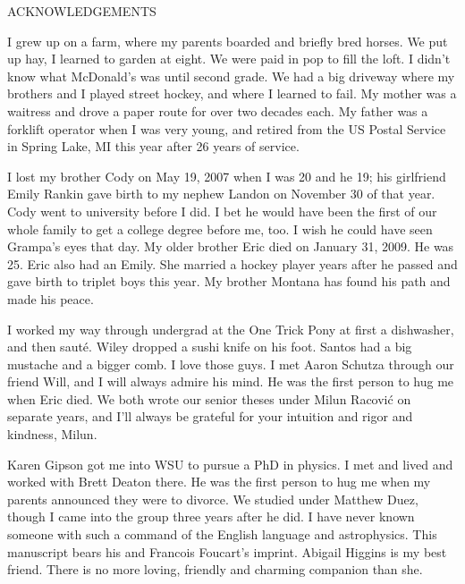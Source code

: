 \label{chap:acknowledgements}

\begin{center}
  \uppercase{Acknowledgements}
\end{center}

\bigskip


I grew up on a farm, where my parents boarded and briefly bred horses. 
We put up hay, I learned to garden at eight.  We were paid in pop to fill the loft. 
I didn't know what McDonald's was until second grade.
We had a big driveway where my brothers and I played street hockey, and where I learned to fail.
My mother was a waitress and drove a paper route for over two decades each.
My father was a forklift operator when I was very young, and retired from the US Postal Service in Spring Lake, MI this year after 26 years of service.
 
I lost my brother Cody on May 19, 2007 when I was 20 and he 19;
his girlfriend Emily Rankin gave birth to my nephew Landon on November 30 of that year.
Cody went to university before I did.
I bet he would have been the first of our whole family to get a college degree before me, too.
I wish he could have seen Grampa's eyes that day.
My older brother Eric died on January 31, 2009. 
He was 25.
Eric also had an Emily.  
She married a hockey player years after he passed and gave birth to triplet boys this year.
My brother Montana has found his path and made his peace.

I worked my way through undergrad at the One Trick Pony at first a dishwasher, and then saut\'e.  
Wiley dropped a sushi knife on his foot.  Santos had a big mustache and a bigger comb.  I love those guys.
I met Aaron Schutza through our friend Will, and I will always admire his mind.  He was the first person to hug me when Eric died.
We both wrote our senior theses under Milun Racovi\'c on separate years, and I'll always be grateful for your intuition and rigor and kindness, Milun.

Karen Gipson got me into WSU to pursue a PhD in physics.  I met and lived and worked with Brett Deaton there.  
He was the first person to hug me when my parents announced they were to divorce.  
We studied under Matthew Duez, though I came into the group three years after he did.
I have never known someone with such a command of the English language and astrophysics.  This manuscript bears his and Francois Foucart's imprint.
Abigail Higgins is my best friend.
There is no more loving, friendly and charming companion than she.





\newpage
